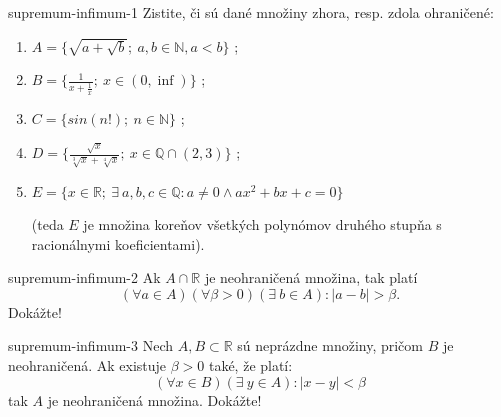 \begin{defproblem}{supremum-infimum-1}
Zistite, či sú dané množiny zhora, resp. zdola ohraničené:

\begin{enumerate}
  \item $A = \{ \sqrt{a + \sqrt{b}} ; \: a, b \in \mathbb{N}, a < b \}$ ;
  \item $B = \{ \frac{1}{x + \frac{1}{x}} ; \: x \in (0, \inf) \}$ ;
  \item $C = \{ sin(n!) ; \: n \in \mathbb{N} \}$ ;
  \item $D = \{ \frac{\sqrt{x}}{\sqrt[3]{x} + \sqrt[4]{x}}; \:
              x \in \mathbb{Q} \cap (2, 3) \}$ ;
  \item $E = \{ x \in \mathbb{R}; \: \exists \: a, b, c \in \mathbb{Q}:
                a \neq 0 \land ax^2 + bx +c = 0 \}$

        (teda $E$ je množina koreňov všetkých polynómov druhého stupňa s
        racionálnymi koeficientami).
\end{enumerate}
\end{defproblem}

\begin{defproblem}{supremum-infimum-2}
Ak $A \cap \mathbb{R}$ je neohraničená množina, tak platí
$$
(\forall a \in A) (\forall \beta > 0) (\exists \: b \in A): |a - b| > \beta .
$$
Dokážte!
\end{defproblem}

\begin{defproblem}{supremum-infimum-3}
Nech $A, B \subset \mathbb{R}$ sú neprázdne množiny, pričom $B$ je
neohraničená. Ak existuje $\beta > 0$ také, že platí:
$$
(\forall x \in B) (\exists \: y \in A): |x - y| < \beta
$$
tak $A$ je neohraničená množina. Dokážte!
\end{defproblem}


